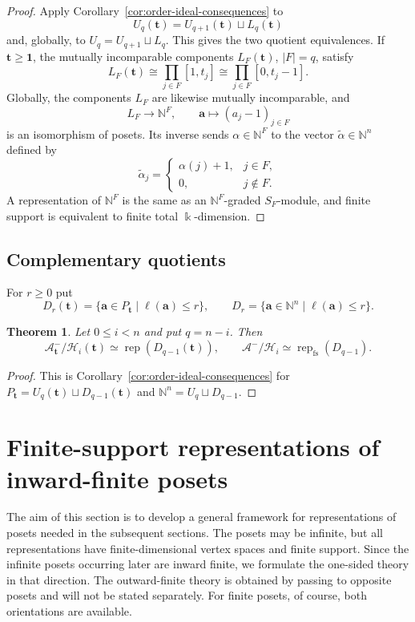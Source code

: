\documentclass[12pt,reqno]{amsart}
\newtheorem{theorem}{Theorem}[section]
\theoremstyle{definition}
\theoremstyle{remark}
\newcommand{\Rep}{\operatorname{rep}}
\begin{document}
\begin{proof}
Apply Corollary~\ref{cor:order-ideal-consequences} to
\[
U_q(\mathbf t)=U_{q+1}(\mathbf t)\sqcup L_q(\mathbf t)
\]
and, globally, to $U_q=U_{q+1}\sqcup L_q$.  This gives the two quotient
equivalences.  If $\mathbf t\ge\mathbf1$, the mutually incomparable components
$L_F(\mathbf t)$, $|F|=q$, satisfy
\[
L_F(\mathbf t)\cong\prod_{j\in F}[1,t_j]
\cong\prod_{j\in F}[0,t_j-1].
\]
Globally, the components $L_F$ are likewise mutually incomparable, and
\[
L_F\longrightarrow\mathbb N^F,
\qquad
\mathbf a\longmapsto (a_j-1)_{j\in F}
\]
is an isomorphism of posets.  Its inverse sends $\alpha\in\mathbb N^F$ to
the vector $\widetilde\alpha\in\mathbb N^n$ defined by
\[
\widetilde\alpha_j=
\begin{cases}
\alpha(j)+1,& j\in F,\\
0,& j\notin F.
\end{cases}
\]
A representation of $\mathbb N^F$ is the same as an $\mathbb N^F$-graded
$S_F$-module, and finite support is equivalent to finite total $\Bbbk$-dimension.
\end{proof}

\subsection{Complementary quotients}\label{subsec:complementary-quotients}

For $r\ge0$ put
\[
D_r(\mathbf t)=\{\mathbf a\in P_{\mathbf t}\mid\ell(\mathbf a)\le r\},
\qquad
D_r=\{\mathbf a\in\mathbb N^n\mid\ell(\mathbf a)\le r\}.
\]
\begin{theorem}\label{thm:complementary-quotient}
Let $0\le i<n$ and put $q=n-i$.  Then
\[
\mathcal A^-_{\mathbf t}/\mathcal H_i(\mathbf t)
\simeq\Rep(D_{q-1}(\mathbf t)),
\qquad
\mathcal A^-/\mathcal H_i
\simeq\Rep_{\mathrm{fs}}(D_{q-1}).
\]
\end{theorem}
\begin{proof}
This is Corollary~\ref{cor:order-ideal-consequences} for
$P_{\mathbf t}=U_q(\mathbf t)\sqcup D_{q-1}(\mathbf t)$ and
$\mathbb N^n=U_q\sqcup D_{q-1}$.
\end{proof}

\section{Finite-support representations of inward-finite posets}
\label{sec:general-fs-theory}

The aim of this section is to develop a general framework for representations
of posets needed in the subsequent sections.  The posets may be infinite, but
all representations have finite-dimensional vertex spaces and finite support.
Since the infinite posets occurring later are inward finite, we formulate the
one-sided theory in that direction.  The outward-finite theory is obtained by
passing to opposite posets and will not be stated separately.  For finite
posets, of course, both orientations are available.
\end{document}
